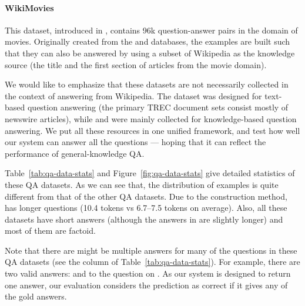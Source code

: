 \paragraph{WikiMovies} This dataset, introduced in , contains 96k question-answer pairs in the domain of movies. Originally created from the  and  databases, the examples are built such that they can also be answered by using a subset of Wikipedia as the knowledge source (the title and the first section of articles from the movie domain).

We would like to emphasize that these datasets are not necessarily collected in the context of answering from Wikipedia. The  dataset was designed for text-based question answering (the primary TREC document sets consist mostly of newswire articles), while  and  were mainly collected for knowledge-based question answering. We put all these resources in one unified framework, and test how well our system can answer all the questions --- hoping that it can reflect the performance of general-knowledge QA.

Table~\ref{tab:qa-data-stats} and Figure~\ref{fig:qa-data-stats} give detailed statistics of these QA datasets. As we can see that, the distribution of  examples is quite different from that of the other QA datasets. Due to the construction method,  has longer questions (10.4 tokens vs 6.7--7.5 tokens on average). Also, all these datasets have short answers (although the answers in  are slightly longer) and most of them are factoid.

Note that there are might be multiple answers for many of the questions in these QA datasets (see the  column of Table~\ref{tab:qa-data-stats}). For example, there are two valid answers:  and  to the question  on . As our system is designed to return one answer, our evaluation considers the prediction as correct if it gives any of the gold answers.

